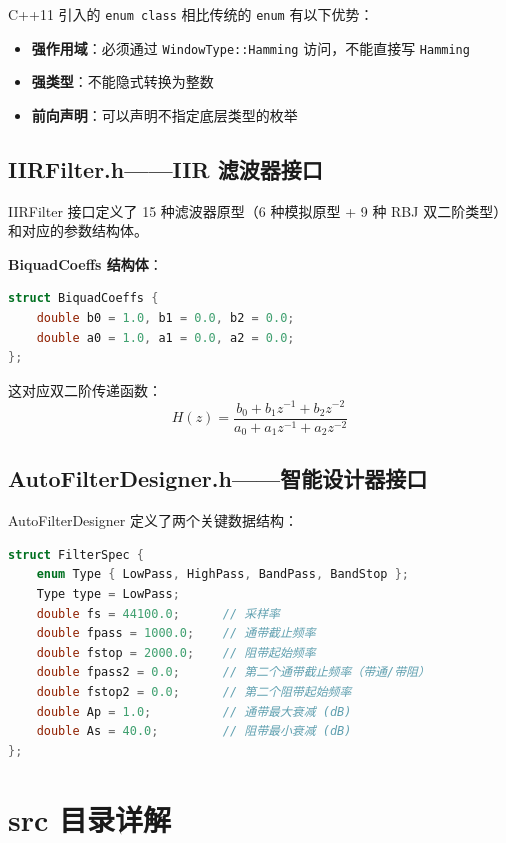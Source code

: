 ﻿\documentclass[12pt,a4paper,oneside]{ctexbook}
\begin{document}
C++11 引入的 \texttt{enum class} 相比传统的 \texttt{enum} 有以下优势：
\begin{itemize}
    \item \textbf{强作用域}：必须通过 \texttt{WindowType::Hamming} 访问，不能直接写 \texttt{Hamming}
    \item \textbf{强类型}：不能隐式转换为整数
    \item \textbf{前向声明}：可以声明不指定底层类型的枚举
\end{itemize}

\subsection{IIRFilter.h——IIR 滤波器接口}

IIRFilter 接口定义了 15 种滤波器原型（6 种模拟原型 + 9 种 RBJ 双二阶类型）和对应的参数结构体。

\textbf{BiquadCoeffs 结构体}：
\begin{lstlisting}[language=C++, caption={双二阶系数结构体}]
struct BiquadCoeffs {
    double b0 = 1.0, b1 = 0.0, b2 = 0.0;
    double a0 = 1.0, a1 = 0.0, a2 = 0.0;
};
\end{lstlisting}

这对应双二阶传递函数：
\[
H(z) = \frac{b_0 + b_1 z^{-1} + b_2 z^{-2}}{a_0 + a_1 z^{-1} + a_2 z^{-2}}
\]

\subsection{AutoFilterDesigner.h——智能设计器接口}

AutoFilterDesigner 定义了两个关键数据结构：

\begin{lstlisting}[language=C++, caption={FilterSpec——用户输入的技术指标}]
struct FilterSpec {
    enum Type { LowPass, HighPass, BandPass, BandStop };
    Type type = LowPass;
    double fs = 44100.0;      // 采样率
    double fpass = 1000.0;    // 通带截止频率
    double fstop = 2000.0;    // 阻带起始频率
    double fpass2 = 0.0;      // 第二个通带截止频率（带通/带阻）
    double fstop2 = 0.0;      // 第二个阻带起始频率
    double Ap = 1.0;          // 通带最大衰减 (dB)
    double As = 40.0;         // 阻带最小衰减 (dB)
};
\end{lstlisting}

\section{src 目录详解}
\end{document}
